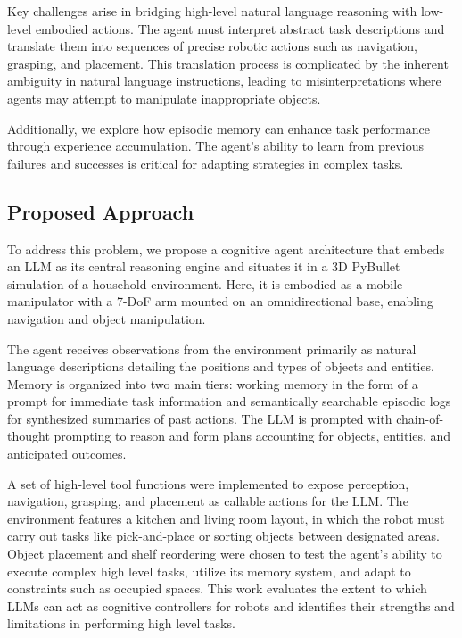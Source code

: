\documentclass[../report.tex]{subfiles}
\begin{document}
Key challenges arise in bridging high-level natural language reasoning with low-level embodied actions. The agent must interpret abstract task descriptions and translate them into sequences of precise robotic actions such as navigation, grasping, and placement. This translation process is complicated by the inherent ambiguity in natural language instructions, leading to misinterpretations where agents may attempt to manipulate inappropriate objects.

Additionally, we explore how episodic memory can enhance task performance through experience accumulation. The agent's ability to learn from previous failures and successes is critical for adapting strategies in complex tasks.

\subsection{Proposed Approach}
\label{sec:introduction:proposed_approach}

To address this problem, we propose a cognitive agent architecture that embeds an LLM as its central reasoning engine and situates it in a 3D PyBullet simulation of a household environment. Here, it is embodied as a mobile manipulator with a 7-DoF arm mounted on an omnidirectional base, enabling navigation and object manipulation.

The agent receives observations from the environment primarily as natural language descriptions detailing the positions and types of objects and entities. Memory is organized into two main tiers: working memory in the form of a prompt for immediate task information and semantically searchable episodic logs for synthesized summaries of past actions. The LLM is prompted with chain-of-thought prompting to reason and form plans accounting for objects, entities, and anticipated outcomes.

A set of high-level tool functions were implemented to expose perception, navigation, grasping, and placement as callable actions for the LLM. The environment features a kitchen and living room layout, in which the robot must carry out tasks like pick-and-place or sorting objects between designated areas. Object placement and shelf reordering were chosen to test the agent's ability to execute complex high level tasks, utilize its memory system, and adapt to constraints such as occupied spaces. This work evaluates the extent to which LLMs can act as cognitive controllers for robots and identifies their strengths and limitations in performing high level tasks.
\end{document}
